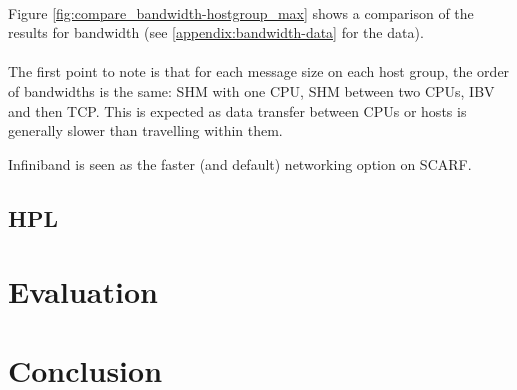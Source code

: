 \documentclass{article}
\begin{document}
            \paragraph{}
            Figure \ref{fig:compare_bandwidth-hostgroup_max} shows a comparison of the results for bandwidth (see \ref{appendix:bandwidth-data} for the data).

            \paragraph{}
            The first point to note is that for each message size on each host group, the order of bandwidths is the same: SHM with one CPU, SHM between two CPUs, IBV and then TCP. This is expected as data transfer between CPUs or hosts is generally slower than travelling within them.

            Infiniband is seen as the faster (and default) networking option on SCARF.








    \subsection{HPL}

\section{Evaluation}

\section{Conclusion}





















\printbibliography[title={Sources}]
\end{document}
